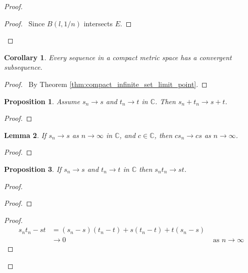 \documentclass{book}
\let\qed\relax
\newtheorem{prop}{Proposition}[chapter]
\newtheorem{cor}{Corollary}[prop]
\newtheorem{lm}[prop]{Lemma}
\theoremstyle{definition}
\begin{document}
\begin{proof}
\pf
{}
\begin{proof}
	\pf\ Since $B(l,1/n)$ intersects $E$.
\end{proof}
\qed
\end{proof}

\begin{cor}
Every sequence in a compact metric space has a convergent subsequence.
\end{cor}

\begin{proof}
\pf\ By Theorem \ref{thm:compact_infinite_set_limit_point}. \qed
\end{proof}

\begin{prop}
Assume $s_n \rightarrow s$ and $t_n \rightarrow t$ in $\mathbb{C}$. Then $s_n + t_n \rightarrow s + t$.
\end{prop}

\begin{proof}
\pf
{}
\qed
\end{proof}

\begin{lm}
If $s_n \rightarrow s$ as $n \rightarrow \infty$ in $\mathbb{C}$, and $c \in \mathbb{C}$, then $c s_n \rightarrow cs$ as $n \rightarrow \infty$.
\end{lm}

\begin{proof}
\pf
{}
\qed
\end{proof}

\begin{prop}
If $s_n \rightarrow s$ and $t_n \rightarrow t$ in $\mathbb{C}$ then $s_n t_n \rightarrow st$.
\end{prop}

\begin{proof}
\pf
{}
\begin{proof}
\end{proof}
\begin{proof}
	\pf
	\begin{align*}
		s_n t_n - st & = (s_n - s)(t_n - t) + s(t_n - t) + t(s_n - s) \\
		& \rightarrow 0 & \text{ as } n \rightarrow \infty
	\end{align*}
\end{proof}
\qed
\end{proof}
\end{document}
